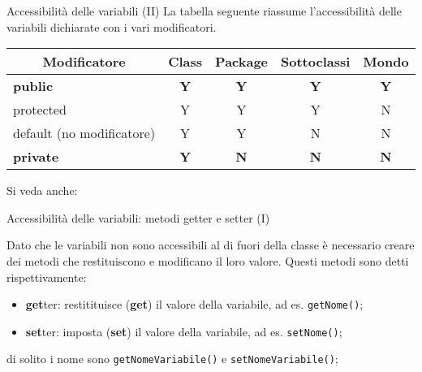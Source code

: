 \begin{frame}{Accessibilità delle variabili (II)}
  La tabella seguente riassume l'accessibilità delle variabili dichiarate con i vari modificatori.
  \begin{table}[htbp]
    \begin{tabular}{|l|cccc|}
      \hline
      \multicolumn{1}{|c|}{\textbf{Modificatore}} & \textbf{Class} & \textbf{Package} & \textbf{Sottoclassi} & \textbf{Mondo} \\ \hline
      \rowcolor[HTML]{9AFF99}
      \textbf{public} & \textbf{Y} & \textbf{Y} & \textbf{Y} & \textbf{Y} \\ \hline
      protected & Y & Y & Y & N \\ \hline
      default
      (no modificatore) & Y & Y & N & N \\ \hline
      \rowcolor[HTML]{FD6864}
      \textbf{private} & \textbf{Y} & \textbf{N} & \textbf{N} & \textbf{N} \\ \hline
    \end{tabular}
  \end{table}
  {\footnotesize Si veda anche:}\\
  {\scriptsize {} }

\end{frame}

\begin{frame}{Accessibilità delle variabili: metodi getter e setter (I)}

  Dato che le variabili \Jprivate{} non sono accessibili al di fuori della classe è necessario creare dei metodi
  che restituiscono e modificano il loro valore. Questi metodi sono detti rispettivamente:
  \begin{itemize}
   \item \textbf{get}ter: restitituisce (\textbf{get}) il valore della variabile, ad es. \texttt{getNome()};
   \item \textbf{set}ter: imposta (\textbf{set}) il valore della variabile, ad es. \texttt{setNome()};
  \end{itemize}
  di solito i nome sono \texttt{getNomeVariabile()} e \texttt{setNomeVariabile()};
   

\end{frame}

